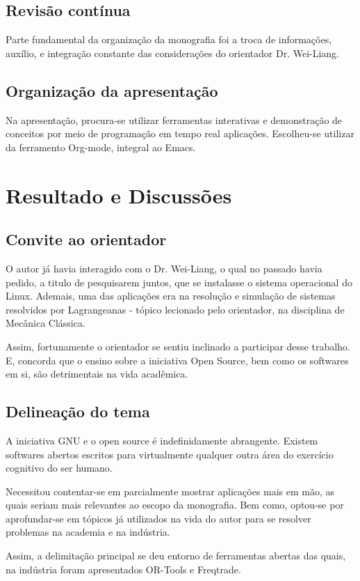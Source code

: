 \documentclass[
12pt,				%
openright,			%
oneside,			%
a4paper,			%
english,			%
french,				%
spanish,			%
brazil,				%
]{abntex2}
\begin{document}
\section{Revisão contínua}
Parte fundamental da organização da monografia foi a troca de
informações, auxílio, e integração constante das considerações do
orientador Dr. Wei-Liang.
\section{Organização da apresentação}
Na apresentação, procura-se utilizar ferramentas interativas e
demonstração de conceitos por meio de programação em tempo real
aplicações. Escolheu-se utilizar da ferramento Org-mode, integral ao
Emacs.

\chapter{Resultado e Discussões}

\section{Convite ao orientador}
O autor já havia interagido com o Dr. Wei-Liang, o qual no passado
havia pedido, a titulo de pesquisarem juntos, que se instalasse o
sistema operacional do Linux. Ademais, uma das aplicações era na
resolução e simulação de sistemas resolvidos por Lagrangeanas - tópico
lecionado pelo orientador, na disciplina de Mecânica Clássica.

Assim, fortunamente o orientador se sentiu inclinado a participar
desse trabalho. E, concorda que o ensino sobre a iniciativa Open
Source, bem como os softwares em si, são detrimentais na vida acadêmica.

\section{Delineação do tema}

A iniciativa GNU e o open source é indefinidamente abrangente. Existem
softwares abertos escritos para virtualmente qualquer outra área do
exercício cognitivo do ser humano.

Necessitou contentar-se em parcialmente mostrar aplicações mais em
mão, as quais seriam mais relevantes ao escopo da monografia. Bem
como, optou-se por aprofundar-se em tópicos já utilizados na vida do
autor para se resolver problemas na academia e na indústria.

Assim, a delimitação principal se deu entorno de ferramentas abertas
das quais, na indústria foram apresentados OR-Tools e
Freqtrade.
\end{document}
